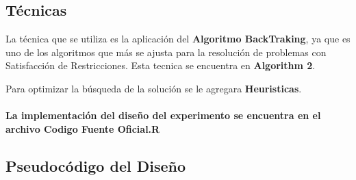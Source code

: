 \documentclass[a4paper]{article}
\begin{document}
\subsection{Técnicas}
La técnica que se utiliza es la aplicación del \textbf{Algoritmo BackTraking}, ya que es uno de los algoritmos que más se ajusta para la resolución de problemas con Satisfacción de Restricciones. Esta tecnica se encuentra en \textbf{Algorithm 2}.
 
Para optimizar la búsqueda de la solución se le agregara \textbf{Heuristicas}.\\
\textbf{\\La implementación del diseño del experimento se encuentra en el archivo Codigo Fuente Oficial.R}

\subsection{Pseudocódigo del Diseño}
\end{document}
